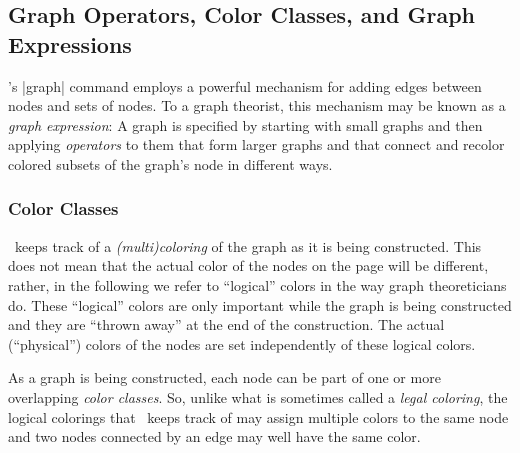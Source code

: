 \subsection{Graph Operators, Color Classes, and Graph Expressions}
\label{section-library-graphs-color-classes}

\tikzname's |graph| command employs a powerful mechanism for
adding edges between nodes and sets of nodes. To a graph theorist,
this mechanism may be known as a \emph{graph expression}: A graph is
specified by starting with small graphs and then applying
\emph{operators} to them that form larger graphs and that connect and
recolor colored subsets of the graph's node in different ways. 


\subsubsection{Color Classes}

\label{section-library-graph-coloring}

\tikzname\ keeps track of a \emph{(multi)coloring} of the graph as it
is being constructed. This does not mean that the 
actual color of the nodes on the page will be different, rather, in
the following we refer to ``logical'' colors in the way graph
theoreticians do. These ``logical'' colors are only important while
the graph is being constructed and they are ``thrown away'' at the end
of the construction. The actual (``physical'') colors of the nodes are
set independently of these logical colors.

As a graph is being constructed, each node can be part of one or more
overlapping \emph{color classes}. So, unlike what is sometimes called a
\emph{legal coloring}, the logical colorings that \tikzname\ keeps
track of may assign multiple colors to the same node and two nodes
connected by an edge may well have the same color.

